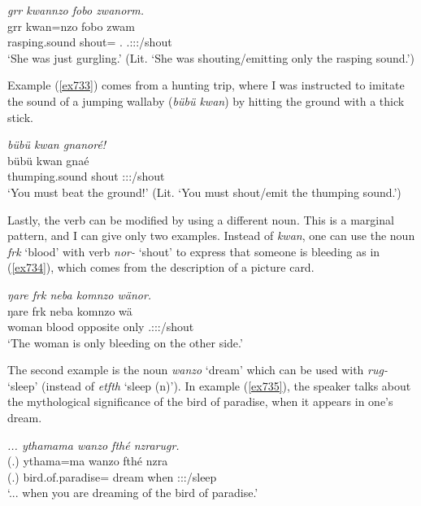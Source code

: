\begin{exe}
	\ex \emph{grr kwannzo fobo zwanorm.}\\
	\gll grr kwan=nzo fobo zwam\\
	rasping.sound shout=\Only{} \Dist{}.\All{} \Tsg.\F:\Sbj:\Pst:\Dur/shout\\
	\trans `She was just gurgling.' (Lit. `She was shouting/emitting only the rasping sound.')
	\label{ex732}
\end{exe}

Example (\ref{ex733}) comes from a hunting trip, where I was instructed to imitate the sound of a jumping wallaby (\emph{bübü kwan}) by hitting the ground with a thick stick.

\begin{exe}
	\ex \emph{bübü kwan gnanoré!}\\
	\gll bübü kwan gnaé\\
	thumping.sound shout \Ssg:\Sbj:\Imp:\Ipfv/shout\\
	\trans `You must beat the ground!' (Lit. `You must shout/emit the thumping sound.')
	\label{ex733}
\end{exe}

Lastly, the verb can be modified by using a different noun. This is a marginal pattern, and I can give only two examples. Instead of \emph{kwan}, one can use the noun \emph{frk} `blood' with verb \emph{nor-} `shout' to express that someone is bleeding as in (\ref{ex734}), which comes from the description of a picture card.

\begin{exe}
	\ex \emph{ŋare frk neba komnzo wänor.}\\
	\gll ŋare frk neba komnzo wä\\
	woman blood opposite only \Tsg.\F:\Sbj:\Nonpast:\Ipfv/shout\\
	\trans `The woman is only bleeding on the other side.'
	\label{ex734}
\end{exe}

The second example is the noun \emph{wanzo} `dream' which can be used with \emph{rug-} `sleep' (instead of \emph{etfth} `sleep (n)'). In example (\ref{ex735}), the speaker talks about the mythological significance of the bird of paradise, when it appears in one's dream.

\begin{exe}
	\ex \emph{... ythamama wanzo fthé nzrarugr.}\\
	\gll (.) ythama=ma wanzo fthé nzra\\
	(.) bird.of.paradise=\Char{} dream when \Stsg:\Sbj:\Irr:\Ipfv/sleep\\
	\trans `... when you are dreaming of the bird of paradise.'
	\label{ex735}
\end{exe}

